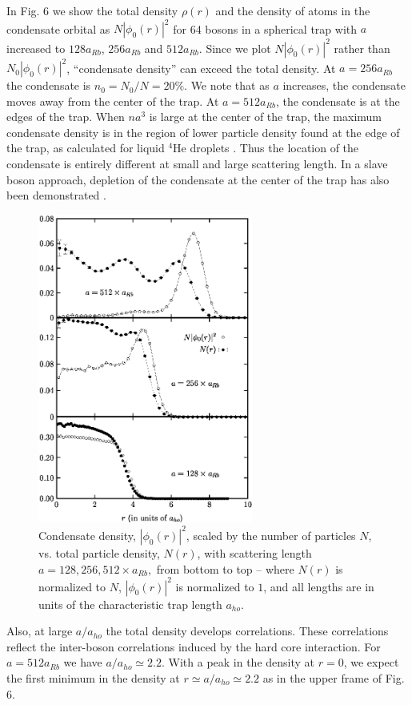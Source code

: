 \documentclass[aps,pra,twocolumn,groupedaddress]{revtex4}
\begin{document}
In Fig. 6 we show the total density $\rho(r)$ and the density of atoms in the
condensate orbital as $N|\phi_0(r)|^2$ for 64 bosons in a spherical trap with
$a$ increased to $128 a_{Rb}$, $256 a_{Rb}$ and $512 a_{Rb}$. Since we plot
$N|\phi_0(r)|^2$ rather than $N_0|\phi_0(r)|^2$, ``condensate density'' can
exceed the total density. At $a=256a_{Rb}$ the condensate is $n_0=N_0/N = 20\%$.
We note that as $a$ increases, the condensate moves
away from the center of the trap. At $a = 512 a_{Rb}$, the condensate is at the
edges of the trap.  When $na^3$ is large at the center of the trap, the maximum
condensate density is in the region
of lower particle density found at the edge of the trap, as calculated for 
liquid $^4$He droplets
\cite{lewart88}. Thus the location of the condensate is entirely different at
small and large scattering length. In a slave boson approach, depletion of the
condensate at the center of the trap has also been demonstrated 
\cite{ziegler97}.
    \begin{figure}[t!]
\center
\includegraphics[height = 4in]{fig6.ps}
 \caption{\footnotesize
    Condensate density, $|\phi_0(r)|^2$, scaled by the number of particles $N$,
    vs. total particle density, $N(r)$, with scattering length
    $a = 128,256,512 \times a_{Rb}, $ from bottom to top -- where $N(r)$ is
    normalized to $N$, $|\phi_0(r)|^2$ is normalized to $1$, and all lengths
    are in units of the characteristic trap length $a_{ho}$.
        }
    \end{figure}
Also, at large $a/a_{ho}$ the total density develops correlations. These correlations
reflect the inter-boson correlations induced by the hard core interaction. For
$a = 512 a_{Rb}$ we have $a/a_{ho} \simeq 2.2$. With a peak
in the density at $r = 0$, we expect the first minimum in the density at $r
\simeq a/a_{ho} \simeq 2.2$ as in the upper frame of Fig. 6.
\end{document}
